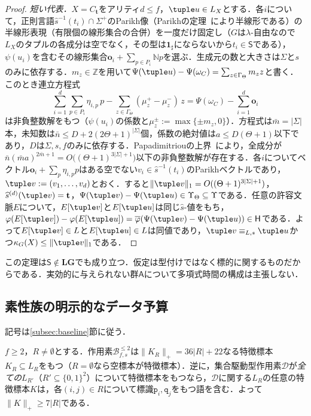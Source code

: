 \begin{proof}
\emph{短い代表．}$X=C_{\mathbf t}$をアリティ$d\le f$，$\tuple u\in L_X$とする．各$i$について，正則言語$\widehat s^{-1}(t_i)\cap\Sigma^+$のParikh像（Parikhの定理~\cite{Parikh1966}により半線形である）の半線形表現（有限個の線形集合の合併）を一度だけ固定し（$G$は$\lambda$-自由なので$L_X$のタプルの各成分は空でなく，その型は$\mathbf 1_\sharp$にならないから$t_i\in\mathsf S$である），$\psi(u_i)$を含むその線形集合$\mathbf o_i+\sum_{p\in P_i}\mathbb Np$を選ぶ．生成元の数と大きさは$\Sigma$と$s$のみに依存する．$m_z\in\mathbb Z$を用いて$\Psi(\tuple u)-\Psi(\omega_C)=\sum_{z\in\Gamma_\Theta}m_zz$と書く．このとき連立方程式
\[
 \sum_{i=1}^d\sum_{p\in P_i}\eta_{i,p}\,p-\sum_{z\in\Gamma_\Theta}(\mu^+_z-\mu^-_z)\,z
 =\Psi(\omega_C)-\sum_{i=1}^d\mathbf o_i
\]
は非負整数解をもつ（$\psi(u_i)$の係数と$\mu^\pm_z:=\max\{\pm m_z,0\}$）．方程式は$\bar m=|\Sigma|$本，未知数は$\bar n\le D+2(2\Theta+1)^{|\Sigma|}$個，係数の絶対値は$a\le D(\Theta+1)$以下であり，$D$は$\Sigma,s,f$のみに依存する．Papadimitriouの上界~\cite{Papadimitriou1981}により，全成分が$\bar n(\bar m a)^{2\bar m+1}=O\bigl((\Theta+1)^{3|\Sigma|+1}\bigr)$以下の非負整数解が存在する．各$i$についてベクトル$\mathbf o_i+\sum_p\eta_{i,p}p$はある空でない$v_i\in\widehat s^{-1}(t_i)$のParikhベクトルであり，$\tuple v:=(v_1,\ldots,v_d)$とおく．すると$\|\tuple v\|_1=O((\Theta+1)^{3|\Sigma|+1})$，$\widehat s^{(d)}(\tuple v)=\mathbf t$，$\Psi(\tuple v)-\Psi(\tuple u)\in\Upsilon_\Theta\subseteq\Upsilon$である．任意の許容文脈$E$について，$E[\tuple v]$と$E[\tuple u]$は同じ$\widehat s$-値をもち，$\varphi(E[\tuple v])-\varphi(E[\tuple u])=\overline\varphi(\Psi(\tuple v)-\Psi(\tuple u))\in\mathsf H$である．よって$E[\tuple v]\in L$と$E[\tuple u]\in L$は同値であり，$\tuple v\equiv_{L,s}\tuple u$かつ$\kappa_G(X)\le\|\tuple v\|_1$である．
\end{proof}

この定理は$\mathsf S\notin\mathbf{LG}$でも成り立つ．仮定は型付けではなく標的に関するものだからである．実効的に与えられない群$\mathsf A$について多項式時間の構成は主張しない．

\subsection{素性族の明示的なデータ予算}
\label{app:feature-budget}

記号は\ref{subsec:baseline}節に従う．

\begin{proposition}[共通の素性型付けに対する明示的なデータ予算]
\label{prop:feature-family-witness-budget}
$f\ge2$，$R\ne\emptyset$とする．作用素$\mathcal B^{\le2}_{f,s}$は$\|K_R\|_+=36|R|+22$なる特徴標本$K_R\subseteq L_R$をもつ（$R=\emptyset$なら空標本が特徴標本）．逆に，集合駆動型作用素$\mathcal D$が\emph{全ての}$L_{R'}$（$R'\subseteq\{0,1\}^2$）について特徴標本をもつなら，$\mathcal D$に関する$L_R$の任意の特徴標本$K$は，各$(i,j)\in R$について標識$\mathtt p_i,\mathtt q_j$をもつ語を含む．よって$\|K\|_+\ge7|R|$である．
\end{proposition}

